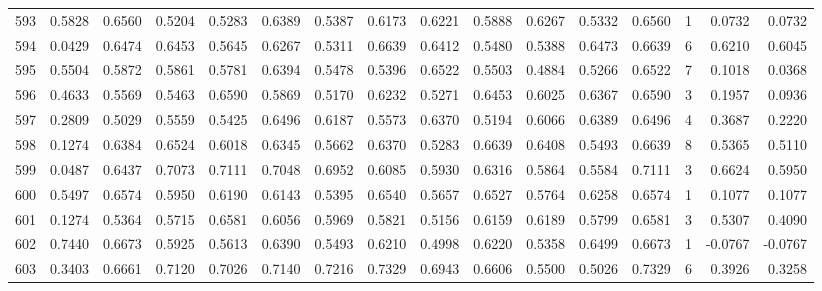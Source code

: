 \begin{tabular}{lrrrrrrrrrrrrrrr}
593 &      0.5828 &  0.6560 &  0.5204 &  0.5283 &  0.6389 &  0.5387 &  0.6173 &  0.6221 &  0.5888 &  0.6267 &   0.5332 &     0.6560 &      1 &                    0.0732 &                     0.0732 \\
594 &      0.0429 &  0.6474 &  0.6453 &  0.5645 &  0.6267 &  0.5311 &  0.6639 &  0.6412 &  0.5480 &  0.5388 &   0.6473 &     0.6639 &      6 &                    0.6210 &                     0.6045 \\
595 &      0.5504 &  0.5872 &  0.5861 &  0.5781 &  0.6394 &  0.5478 &  0.5396 &  0.6522 &  0.5503 &  0.4884 &   0.5266 &     0.6522 &      7 &                    0.1018 &                     0.0368 \\
596 &      0.4633 &  0.5569 &  0.5463 &  0.6590 &  0.5869 &  0.5170 &  0.6232 &  0.5271 &  0.6453 &  0.6025 &   0.6367 &     0.6590 &      3 &                    0.1957 &                     0.0936 \\
597 &      0.2809 &  0.5029 &  0.5559 &  0.5425 &  0.6496 &  0.6187 &  0.5573 &  0.6370 &  0.5194 &  0.6066 &   0.6389 &     0.6496 &      4 &                    0.3687 &                     0.2220 \\
598 &      0.1274 &  0.6384 &  0.6524 &  0.6018 &  0.6345 &  0.5662 &  0.6370 &  0.5283 &  0.6639 &  0.6408 &   0.5493 &     0.6639 &      8 &                    0.5365 &                     0.5110 \\
599 &      0.0487 &  0.6437 &  0.7073 &  0.7111 &  0.7048 &  0.6952 &  0.6085 &  0.5930 &  0.6316 &  0.5864 &   0.5584 &     0.7111 &      3 &                    0.6624 &                     0.5950 \\
600 &      0.5497 &  0.6574 &  0.5950 &  0.6190 &  0.6143 &  0.5395 &  0.6540 &  0.5657 &  0.6527 &  0.5764 &   0.6258 &     0.6574 &      1 &                    0.1077 &                     0.1077 \\
601 &      0.1274 &  0.5364 &  0.5715 &  0.6581 &  0.6056 &  0.5969 &  0.5821 &  0.5156 &  0.6159 &  0.6189 &   0.5799 &     0.6581 &      3 &                    0.5307 &                     0.4090 \\
602 &      0.7440 &  0.6673 &  0.5925 &  0.5613 &  0.6390 &  0.5493 &  0.6210 &  0.4998 &  0.6220 &  0.5358 &   0.6499 &     0.6673 &      1 &                   -0.0767 &                    -0.0767 \\
603 &      0.3403 &  0.6661 &  0.7120 &  0.7026 &  0.7140 &  0.7216 &  0.7329 &  0.6943 &  0.6606 &  0.5500 &   0.5026 &     0.7329 &      6 &                    0.3926 &                     0.3258 \\

\end{tabular}
